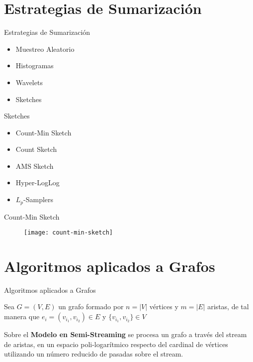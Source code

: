 \documentclass[12pt]{beamer}
\begin{document}
  \section{Estrategias de Sumarización}

    \begin{frame}[fragile]{Estrategias de Sumarización}

      \begin{itemize}
        \item Muestreo Aleatorio
        \item Histogramas
        \item Wavelets
        \item Sketches
      \end{itemize}

    \end{frame}


    \begin{frame}[fragile]{Sketches}

      \begin{itemize}
        \item Count-Min Sketch
        \item Count Sketch
        \item AMS Sketch
        \item Hyper-LogLog
        \item $L_p$-Samplers
      \end{itemize}

    \end{frame}


    \begin{frame}[fragile]{Count-Min Sketch}

      \begin{figure}
        \texttt{[image: count-min-sketch]}
        \caption{}
        \label{}
      \end{figure}

    \end{frame}

  \section{Algoritmos aplicados a Grafos}

    \begin{frame}[fragile]{Algoritmos aplicados a Grafos}

      Sea $G=(V,E)$ un grafo formado por $n=|V|$ vértices y $m=|E|$ aristas, de tal manera que $e_i = (v_{i_1},v_{i_2}) \in E$ y $\{v_{i_1},v_{i_2}\} \in V$

      Sobre el \textbf{Modelo en Semi-Streaming} se procesa un grafo a través del stream de aristas, en un espacio poli-logarítmico respecto del cardinal de vértices utilizando un número reducido de pasadas sobre el stream.

    \end{frame}
\end{document}
